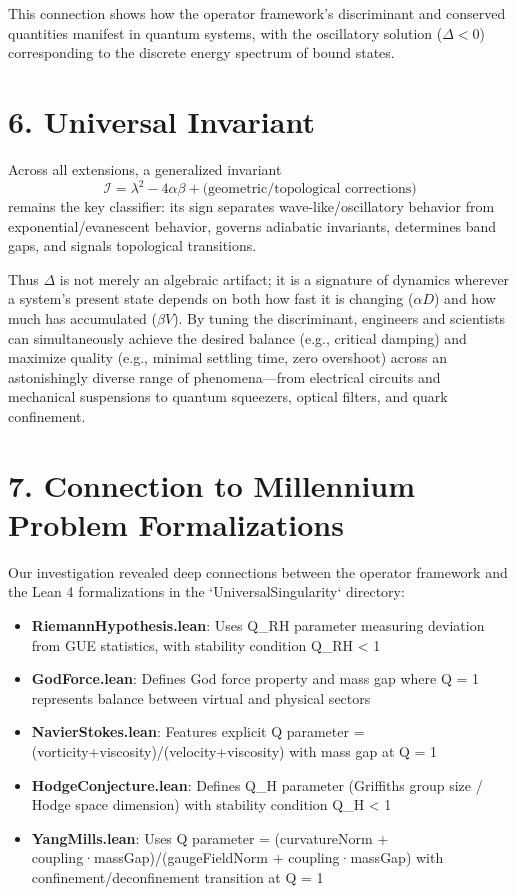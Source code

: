 \documentclass[11pt]{article}
\begin{document}
This connection shows how the operator framework's discriminant and conserved quantities manifest in quantum systems, with the oscillatory solution ($\Delta < 0$) corresponding to the discrete energy spectrum of bound states.

\section{6. Universal Invariant}
Across all extensions, a generalized invariant
$$
\mathcal{I} = \lambda^2 - 4\alpha\beta + \text{(geometric/topological corrections)}
$$
remains the key classifier: its sign separates wave-like/oscillatory behavior from exponential/evanescent behavior, governs adiabatic invariants, determines band gaps, and signals topological transitions.

Thus $\Delta$ is not merely an algebraic artifact; it is a signature of dynamics wherever a system's present state depends on both how fast it is changing ($\alpha D$) and how much has accumulated ($\beta V$). By tuning the discriminant, engineers and scientists can simultaneously achieve the desired balance (e.g., critical damping) and maximize quality (e.g., minimal settling time, zero overshoot) across an astonishingly diverse range of phenomena—from electrical circuits and mechanical suspensions to quantum squeezers, optical filters, and quark confinement.

\section{7. Connection to Millennium Problem Formalizations}

Our investigation revealed deep connections between the operator framework and the Lean 4 formalizations in the `UniversalSingularity` directory:
\begin{itemize}
\item \textbf{RiemannHypothesis.lean}: Uses Q_RH parameter measuring deviation from GUE statistics, with stability condition Q_RH < 1
\item \textbf{GodForce.lean}: Defines God force property and mass gap where Q = 1 represents balance between virtual and physical sectors
\item \textbf{NavierStokes.lean}: Features explicit Q parameter = (vorticity+viscosity)/(velocity+viscosity) with mass gap at Q = 1
\item \textbf{HodgeConjecture.lean}: Defines Q_H parameter (Griffiths group size / Hodge space dimension) with stability condition Q_H < 1
\item \textbf{YangMills.lean}: Uses Q parameter = (curvatureNorm + coupling·massGap)/(gaugeFieldNorm + coupling·massGap) with confinement/deconfinement transition at Q = 1
\end{itemize}
\end{document}
